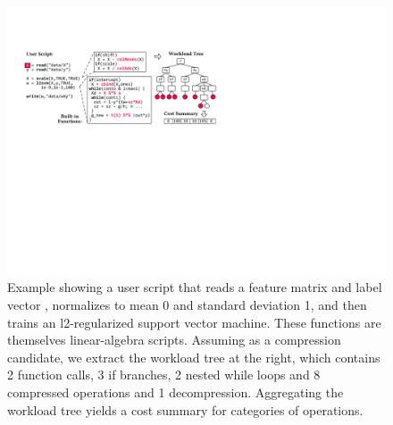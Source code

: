 \begin{figure}[!t]
  \centering
  \includegraphics[width=0.8\linewidth]{fig/fig06}
  \vspace{-0.15cm}
  \caption{\label{fig:wtree}
  Example showing a user script that reads a feature matrix  and label vector ,
  normalizes  to mean 0 and standard deviation 1, and then trains an l2-regularized support vector machine.
  These functions are themselves linear-algebra scripts.
  Assuming  as a compression candidate, we extract the workload tree at the right,
  which contains 2 function calls, 3 if branches,
  2 nested while loops and 8 compressed operations and 1 decompression.
  Aggregating the workload tree yields a cost summary for categories of operations.
  }
  \Description{}
\end{figure}


